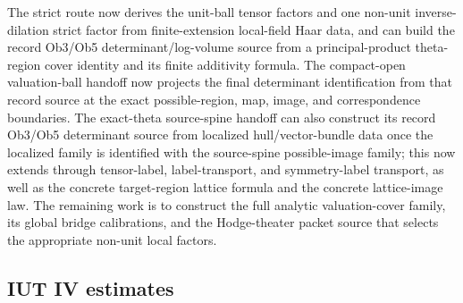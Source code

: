\documentclass[11pt]{article}
\newcommand{\IUT}{IUT}
\theoremstyle{plain}
\theoremstyle{definition}
\theoremstyle{remark}
\begin{document}
The strict route now derives the unit-ball tensor factors and one non-unit
inverse-dilation strict factor from finite-extension local-field Haar data, and
can build the record Ob3/Ob5 determinant/log-volume source from a
principal-product theta-region cover identity and its finite additivity formula.
The compact-open valuation-ball handoff now projects the final determinant
identification from that record source at the exact possible-region, map,
image, and correspondence boundaries.
The exact-theta source-spine handoff can also construct its record Ob3/Ob5
determinant source from localized hull/vector-bundle data once the localized
family is identified with the source-spine possible-image family; this now
extends through tensor-label, label-transport, and symmetry-label transport,
as well as the concrete target-region lattice formula and the concrete
lattice-image law.  The remaining work is to construct the full analytic
valuation-cover family, its global bridge calibrations, and the Hodge-theater
packet source that selects the appropriate non-unit local factors.

\subsection{\IUT{} IV estimates}
\end{document}
